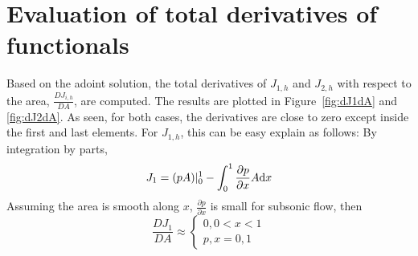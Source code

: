 \documentclass[a4paper]{article}
\begin{document}
\section{Evaluation of total derivatives of functionals}
Based on the adoint solution, the total derivatives of $J_{1,h}$ and $J_{2,h}$ with respect to the area, $\frac{DJ_{i,h}}{DA}$, are computed. The results are plotted in Figure~\ref{fig:dJ1dA} and \ref{fig:dJ2dA}.
As seen, for both cases, the derivatives are close to zero except inside the first and last elements. For $J_{1,h}$, this can be easy explain as follows:
By integration by parts, 
\begin{equation*}
J_1 = (pA)|^{1}_{0} - \int_{0}^{1}\frac{\partial p}{\partial x}A\mathrm{d} x
\end{equation*}
Assuming the area is smooth along $x$, $\frac{\partial p}{\partial x}$ is small for subsonic flow, then
\begin{equation*}
\frac{DJ_1}{DA} \approx \begin{cases}
0, 0<x<1 \\
p, x=0,1
\end{cases}
\end{equation*} 
\end{document}
